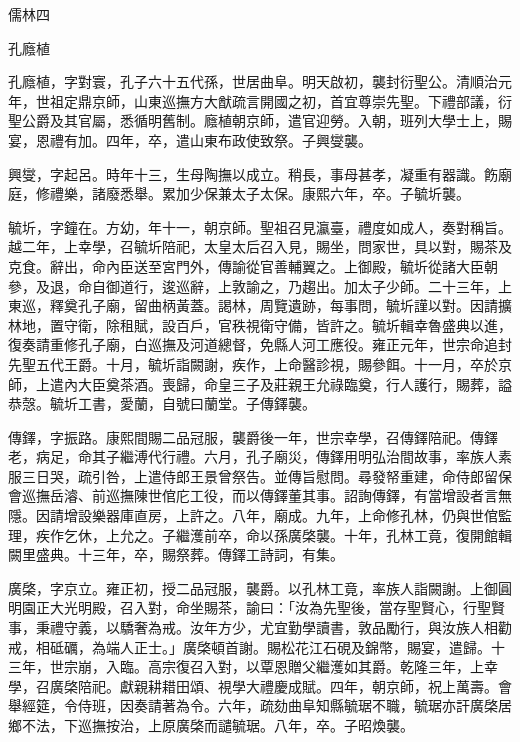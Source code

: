 
\begin{pinyinscope}
儒林四

孔廕植

孔廕植，字對寰，孔子六十五代孫，世居曲阜。明天啟初，襲封衍聖公。清順治元年，世祖定鼎京師，山東巡撫方大猷疏言開國之初，首宜尊崇先聖。下禮部議，衍聖公爵及其官屬，悉循明舊制。廕植朝京師，遣官迎勞。入朝，班列大學士上，賜宴，恩禮有加。四年，卒，遣山東布政使致祭。子興燮襲。

興燮，字起呂。時年十三，生母陶撫以成立。稍長，事母甚孝，凝重有器識。飭廟庭，修禮樂，諸廢悉舉。累加少保兼太子太保。康熙六年，卒。子毓圻襲。

毓圻，字鐘在。方幼，年十一，朝京師。聖祖召見瀛臺，禮度如成人，奏對稱旨。越二年，上幸學，召毓圻陪祀，太皇太后召入見，賜坐，問家世，具以對，賜茶及克食。辭出，命內臣送至宮門外，傳諭從官善輔翼之。上御殿，毓圻從諸大臣朝參，及退，命自御道行，逡巡辭，上敦諭之，乃趨出。加太子少師。二十三年，上東巡，釋奠孔子廟，留曲柄黃蓋。謁林，周覽遺跡，每事問，毓圻謹以對。因請擴林地，置守衛，除租賦，設百戶，官秩視衛守備，皆許之。毓圻輯幸魯盛典以進，復奏請重修孔子廟，白巡撫及河道總督，免縣人河工應役。雍正元年，世宗命追封先聖五代王爵。十月，毓圻詣闕謝，疾作，上命醫診視，賜參餌。十一月，卒於京師，上遣內大臣奠茶酒。喪歸，命皇三子及莊親王允祿臨奠，行人護行，賜葬，謚恭愨。毓圻工書，愛蘭，自號曰蘭堂。子傳鐸襲。

傳鐸，字振路。康熙間賜二品冠服，襲爵後一年，世宗幸學，召傳鐸陪祀。傳鐸老，病足，命其子繼溥代行禮。六月，孔子廟災，傳鐸用明弘治間故事，率族人素服三日哭，疏引咎，上遣侍郎王景曾祭告。並傳旨慰問。尋發帑重建，命侍郎留保會巡撫岳濬、前巡撫陳世倌庀工役，而以傳鐸董其事。詔詢傳鐸，有當增設者言無隱。因請增設樂器庫直房，上許之。八年，廟成。九年，上命修孔林，仍與世倌監理，疾作乞休，上允之。子繼濩前卒，命以孫廣棨襲。十年，孔林工竟，復開館輯闕里盛典。十三年，卒，賜祭葬。傳鐸工詩詞，有集。

廣棨，字京立。雍正初，授二品冠服，襲爵。以孔林工竟，率族人詣闕謝。上御圓明園正大光明殿，召入對，命坐賜茶，諭曰：「汝為先聖後，當存聖賢心，行聖賢事，秉禮守義，以驕奢為戒。汝年方少，尤宜勤學讀書，敦品勵行，與汝族人相勸戒，相砥礪，為端人正士。」廣棨頓首謝。賜松花江石硯及錦幣，賜宴，遣歸。十三年，世宗崩，入臨。高宗復召入對，以覃恩贈父繼濩如其爵。乾隆三年，上幸學，召廣棨陪祀。獻親耕耤田頌、視學大禮慶成賦。四年，朝京師，祝上萬壽。會舉經筵，令侍班，因奏請著為令。六年，疏劾曲阜知縣毓琚不職，毓琚亦訐廣棨居鄉不法，下巡撫按治，上原廣棨而譴毓琚。八年，卒。子昭煥襲。


\end{pinyinscope}
